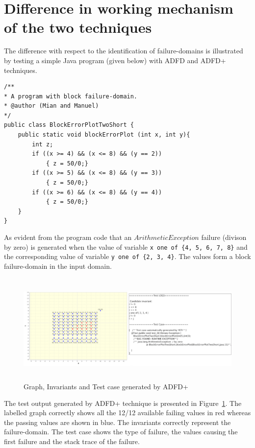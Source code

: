 \documentclass[runningheads,a4paper]{llncs}
\begin{document}
\section{Difference in working mechanism of the two techniques}
The difference with respect to the identification of failure-domains is illustrated by testing a simple Java program (given below) with ADFD and ADFD+ techniques. 
\smallskip
\begin{lstlisting}
/** 
* A program with block failure-domain.
* @author (Mian and Manuel)
*/
public class BlockErrorPlotTwoShort {
	public static void blockErrorPlot (int x, int y){
		int z;
		if ((x >= 4) && (x <= 8) && (y == 2))
			{ z = 50/0;}
		if ((x >= 5) && (x <= 8) && (y == 3))
			{ z = 50/0;}
		if ((x >= 6) && (x <= 8) && (y == 4))
			{ z = 50/0;}
	}
}
\end{lstlisting}
\smallskip
As evident from the program code that an $ArithmeticException$ failure (divison by zero) is generated when the value of variable \verb+x one of {4, 5, 6, 7, 8}+ and the corresponding value of variable \verb+y one of {2, 3, 4}+. The values form a block failure-domain in the input domain. 

\begin{figure}[H]
\centering
\includegraphics[width= 12.5cm,height=5.5cm]{adfdPlusCombined.png}
\caption{Graph, Invariants and Test case generated by ADFD+}
\label{fig:ADFD+}
\end{figure}


The test output generated by ADFD+ technique is presented in Figure~\ref{fig:ADFD+}. The labelled graph correctly shows all the 12/12 available failing values in red whereas the passing values are shown in blue. The invariants correctly represent the failure-domain. The test case shows the type of failure, the values causing the first failure and the stack trace of the failure.
\end{document}
